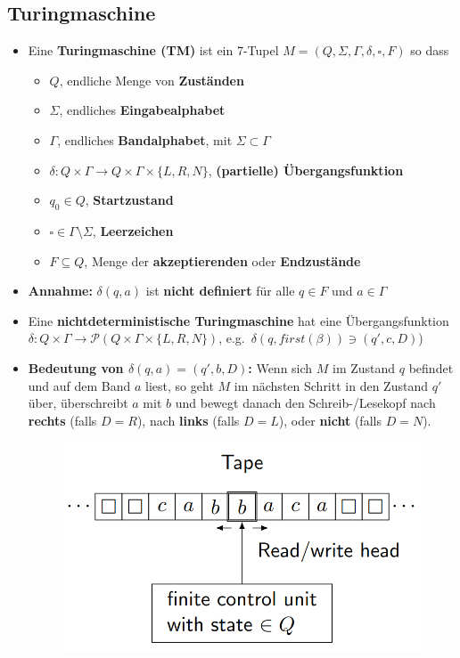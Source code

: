 \documentclass[ieeetran]{article}
\begin{document}
\subsection{Turingmaschine} %
\label{sub:turingmaschine}
\begin{itemize}
  \item Eine \textbf{Turingmaschine (TM)} ist ein 7-Tupel $M = (Q,\Sigma, \Gamma, \delta, \square, F)$ so dass
	 \begin{itemize}
	   \item $Q$, endliche Menge von \textbf{Zuständen}
	\item $\Sigma$, endliches \textbf{Eingabealphabet}
	\item $\Gamma$, endliches \textbf{Bandalphabet}, mit $\Sigma \subset \Gamma$
	\item $\delta: Q \times \Gamma \rightarrow Q \times \Gamma \times \{L,R,N\}$, \textbf{(partielle) Übergangsfunktion} 
		
	\item $q_0 \in Q$, \textbf{Startzustand}
	\item $\square \in \Gamma \setminus \Sigma$, \textbf{Leerzeichen}
		\item $F \subseteq Q$, Menge der \textbf{akzeptierenden} oder \textbf{Endzustände}

	 \end{itemize}
	 \item \textbf{Annahme:} $\delta(q,a)$ ist \textbf{nicht definiert} für alle $q \in F$ und $a \in \Gamma$
	 \item Eine \textbf{nichtdeterministische Turingmaschine} hat eine Übergangsfunktion $\delta: Q \times \Gamma \rightarrow \mathcal{P}(Q \times \Gamma \times \{L,R,N\})$, e.g.\ $\delta(q,first(\beta)) \ni (q',c , D)$)
		 \item \textbf{Bedeutung von $\delta(q,a) = (q',b,D)$:} Wenn sich $M$ im Zustand $q$ befindet und auf dem Band $a$ liest, so geht $M$ im nächsten Schritt in den Zustand $q'$ über, überschreibt $a$ mit $b$ und bewegt danach den Schreib-/Lesekopf nach \textbf{rechts} (falls $D =R$), nach \textbf{links} (falls $D = L$), oder \textbf{nicht} (falls $D = N$).

	\begin{figure}[h!]
	  \centering
	  \includegraphics[width=0.3\linewidth]{tm}
	  \label{fig:filename}
	\end{figure}


\end{itemize}
\end{document}
